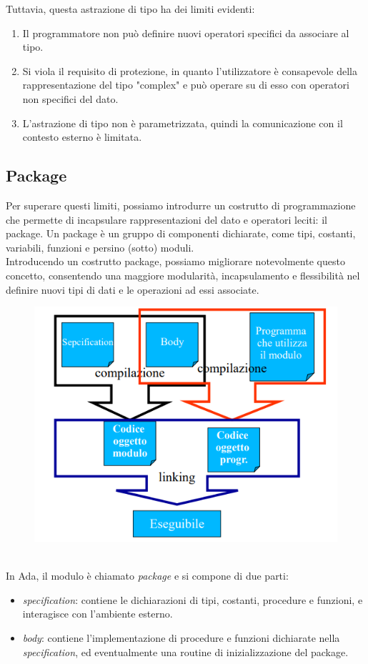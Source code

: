 \documentclass{article}
\begin{document}
	Tuttavia, questa astrazione di tipo ha dei limiti evidenti:
	\begin{enumerate}
	    \item Il programmatore non può definire nuovi operatori specifici da associare al tipo.
	    \item Si viola il requisito di protezione, in quanto l'utilizzatore è consapevole della rappresentazione del tipo "complex" e può operare su di esso con operatori non specifici del dato.
	    \item L'astrazione di tipo non è parametrizzata, quindi la comunicazione con il contesto esterno è limitata.
	\end{enumerate}

	\subsection{Package}
	Per superare questi limiti, possiamo introdurre un costrutto di programmazione che permette di incapsulare rappresentazioni del dato e operatori leciti: il package. Un package è un gruppo di componenti dichiarate, come tipi, costanti, variabili, funzioni e persino (sotto) moduli. \\
	Introducendo un costrutto package, possiamo migliorare notevolmente questo concetto, consentendo una maggiore modularità, incapsulamento e flessibilità nel definire nuovi tipi di dati e le operazioni ad essi associate.
	\begin{figure}[h]
		\centering
		\includegraphics[width=0.5\linewidth]{assets/package} 
		\caption{}
		\label{fig:etichetta}
	\end{figure}
	\vspace{\baselineskip} \\
	In Ada, il modulo è chiamato \textit{package} e si compone di due parti:
	\begin{itemize}
		\item \textit{specification}: contiene le dichiarazioni di tipi, costanti, procedure e funzioni, e interagisce con l'ambiente esterno.
		\item \textit{body}: contiene l'implementazione di procedure e funzioni dichiarate nella \textit{specification}, ed eventualmente una routine di inizializzazione del package.
	\end{itemize}
\end{document}
